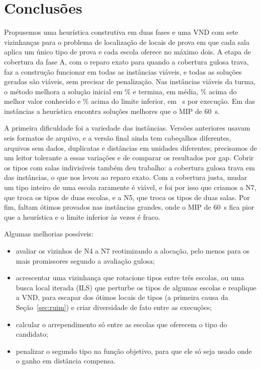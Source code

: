 \documentclass[12pt]{article}
\begin{document}
\section{Conclusões}\label{sec:conclusao}

Propusemos uma heurística construtiva em duas fases e uma VND com sete vizinhanças para o problema
de localização de locais de prova em que cada sala aplica um único tipo de prova e cada escola
oferece no máximo dois. A etapa de cobertura da fase A, com o reparo exato para quando a cobertura
gulosa trava, faz a construção funcionar em todas as instâncias viáveis, e todas as soluções
geradas são viáveis, sem precisar de penalização. Nas \nInst{} instâncias viáveis da turma, o
método melhora a solução inicial em \melhoria\% e termina, em média, \gapFin\% acima do melhor
valor conhecido e \gapLb\% acima do limite inferior, em \tempoMedio~s por execução. Em
\melhorQueMip{} das \nInst{} instâncias a heurística encontra soluções melhores que o MIP de 60~s.

A primeira dificuldade foi a variedade das instâncias. Versões anteriores usavam seis formatos de
arquivo, e a versão final ainda tem cabeçalhos diferentes, arquivos sem dados, duplicatas e
distâncias em unidades diferentes; precisamos de um leitor tolerante a essas variações e de
comparar os resultados por gap. Cobrir os tipos com salas indivisíveis também deu trabalho: a
cobertura gulosa trava em \reparoInst{} das \nInst{} instâncias, o que nos levou ao reparo exato.
Com a cobertura justa, mudar um tipo inteiro de uma escola raramente é viável, e foi por isso que
criamos a N7, que troca os tipos de duas escolas, e a N5, que troca os tipos de duas salas. Por
fim, faltam ótimos provados nas instâncias grandes, onde o MIP de 60~s fica pior que a heurística
e o limite inferior às vezes é fraco.

Algumas melhorias possíveis:
\begin{itemize}
  \item avaliar os vizinhos de N4 a N7 reotimizando a alocação, pelo menos para os mais promissores
    segundo a avaliação gulosa;
  \item acrescentar uma vizinhança que rotacione tipos entre três escolas, ou uma busca local
    iterada (ILS) que perturbe os tipos de algumas escolas e reaplique a VND, para escapar dos
    ótimos locais de tipos (a primeira causa da Seção~\ref{sec:ruim}) e criar diversidade de fato
    entre as execuções;
  \item calcular o arrependimento só entre as escolas que oferecem o tipo do candidato;
  \item penalizar o segundo tipo na função objetivo, para que ele só seja usado onde o ganho em
    distância compensa.
\end{itemize}



\end{document}

